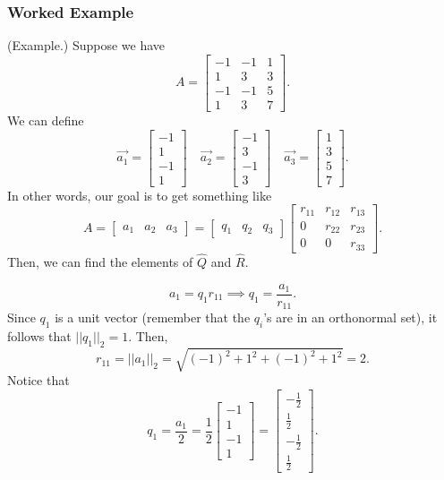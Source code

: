 \documentclass[letterpaper]{article}
\begin{document}
\subsubsection{Worked Example}
\begin{mdframed}
    (Example.) Suppose we have \[A = \begin{bmatrix}
        -1 & -1 & 1 \\ 
        1 & 3 & 3 \\ 
        -1 & -1 & 5 \\ 
        1 & 3 & 7
    \end{bmatrix}.\]
    We can define 
    \[\vec{a_1} = \begin{bmatrix}
        -1 \\ 1 \\ -1 \\ 1
    \end{bmatrix} \quad \vec{a_2} = \begin{bmatrix}
        -1 \\ 3 \\ -1 \\ 3
    \end{bmatrix} \quad \vec{a_3} = \begin{bmatrix}
        1 \\ 3 \\ 5 \\ 7
    \end{bmatrix}.\]
    In other words, our goal is to get something like 
    \[A = \begin{bmatrix}
        a_1 & a_2 & a_3
    \end{bmatrix} = \begin{bmatrix}
        q_1 & q_2 & q_3
    \end{bmatrix} \begin{bmatrix}
        r_{11} & r_{12} & r_{13} \\ 
        0 & r_{22} & r_{23} \\ 
        0 & 0 & r_{33}
    \end{bmatrix}.\]
    Then, we can find the elements of $\hat{Q}$ and $\hat{R}$. 
    \begin{mdframed}
        \[a_1 = q_1 r_{11} \implies q_1 = \frac{a_1}{r_{11}}.\]
        Since $q_1$ is a unit vector (remember that the $q_i$'s are in an orthonormal set), it follows that $||q_1||_2 = 1$. Then, 
        \[r_{11} = ||a_{1}||_2 = \sqrt{(-1)^2 + 1^2 + (-1)^2 + 1^2} = 2.\]
        Notice that 
        \[q_1 = \frac{a_1}{2} = \frac{1}{2} \begin{bmatrix}
            -1 \\ 1 \\ -1 \\ 1 
        \end{bmatrix} = \begin{bmatrix}
            -\frac{1}{2} \\ \frac{1}{2} \\ -\frac{1}{2} \\ \frac{1}{2}
        \end{bmatrix}.\]
    \end{mdframed}


\end{mdframed}
\end{document}
